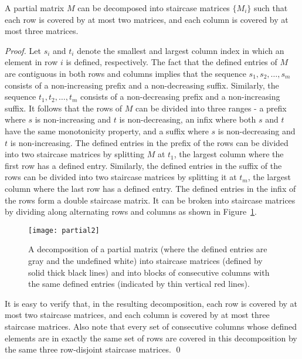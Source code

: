 \documentclass{llncs}
\begin{document}
\begin{lemma}\label{lemma:decomposition}
A partial matrix $M$ can be decomposed into staircase
matrices $\{M_i\}$ such that each row is covered by at most two matrices,
and each column is covered by at most three  matrices.
\end{lemma}
\begin{proof}

Let $s_i$ and $t_i$ denote the smallest and largest column index
in which an element in row $i$ is defined, respectively. 
The fact that the defined entries of $M$ are contiguous in both rows
and columns implies that the sequence $s_1, s_2, \dots, s_m$ consists of a
non-increasing prefix and a non-decreasing suffix. Similarly, the 
sequence $t_1, t_2, \dots, t_m$ consists of a
non-decreasing prefix and a non-increasing suffix. 
It follows that the rows of $M$ can be divided into three ranges - 
a prefix where $s$ is non-increasing and $t$ is non-decreasing, an infix where
both $s$ and $t$ have the same monotonicity property, and a suffix
where $s$ is non-decreasing and $t$ is non-increasing.
The defined entries in the prefix of the rows can be divided into two
staircase matrices by splitting $M$ at $t_1$, the largest column where the
first row has a defined entry. 
Similarly, the defined entries in the suffix of the rows can be divided into two
staircase matrices by splitting it at $t_m$, the largest column where the
last row has a defined entry. 
The defined entries in the infix of the rows form a double staircase
matrix. It can be broken into staircase matrices by dividing along
alternating rows and columns as shown in Figure~\ref{fig:partial}. 

\begin{figure}[h!]
\centering
   \texttt{[image: partial2]}
   \caption{
   A decomposition of a partial matrix (where the defined entries are gray and the undefined white) into staircase matrices
     (defined by solid thick black lines) and into blocks of consecutive
     columns with the same defined entries (indicated by thin vertical
     red lines).\label{fig:partial}}
 \end{figure}

It is easy to verify that, in the resulting decomposition, each row
is covered by at most two staircase matrices, and each column is covered
by at most three staircase matrices.
Also note that  every set of consecutive
columns whose defined elements are in exactly the same set of rows are covered
in this decomposition by the same three row-disjoint staircase matrices. \qed
\end{proof}
\end{document}
